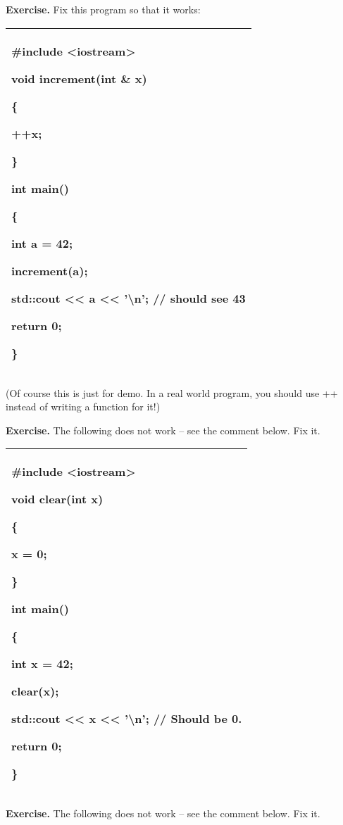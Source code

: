 \documentclass[
]{article}
\begin{document}
\textbf{Exercise.} Fix this program so that it works:

\begin{longtable}[]{@{}l@{}}
\toprule
\endhead
\begin{minipage}[t]{0.97\columnwidth}\raggedright
\#include \textless iostream\textgreater{}

void increment(int \& x)

\{

++x;

\}

int main()

\{

int a = 42;

increment(a);

std::cout \textless\textless{} a \textless\textless{}
'\textbackslash n'; // should see 43

return 0;

\}\strut
\end{minipage}\tabularnewline
\bottomrule
\end{longtable}

(Of course this is just for demo. In a real world program, you should
use ++ instead of writing a function for it!)

\textbf{Exercise.} The following does not work -- see the comment below.
Fix it.

\begin{longtable}[]{@{}l@{}}
\toprule
\endhead
\begin{minipage}[t]{0.97\columnwidth}\raggedright
\#include \textless iostream\textgreater{}

void clear(int x)

\{

x = 0;

\}

int main()

\{

int x = 42;

clear(x);

std::cout \textless\textless{} x \textless\textless{}
'\textbackslash n'; // Should be 0.

return 0;

\}\strut
\end{minipage}\tabularnewline
\bottomrule
\end{longtable}

\textbf{Exercise.} The following does not work -- see the comment below.
Fix it.
\end{document}
